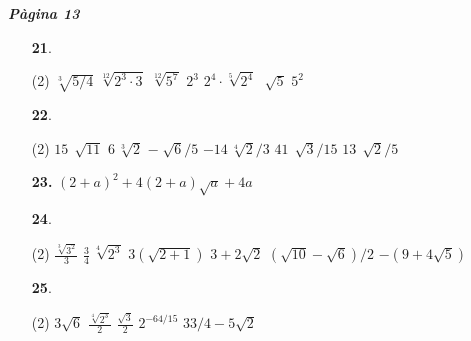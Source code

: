 \documentclass[a4paper, pdf, twoside]{book}
\begin{document}
\begin{multicols}{2}
{\textbf{\em Pàgina 13}} \hrulefill
\begin{enumerate}
\vspace{0.25cm}



 \item[\fontfamily{phv}\selectfont\color{blue}\textbf{21}. ]  \scalebox{0.6}{\simbolclau } 
 \begin{tasks}[column-sep=1em, item-indent=1.3333em](2)
	 \task $\sqrt [{3}]{5/4} $
	 \task $\sqrt [{12}]{2^{3} \cdot 3} $
	 \task $\sqrt [{12}]{5^{7} } $
	 \task $2^{3} $
	 \task $2^{4} \cdot \sqrt [{5}]{2^{4} } $
	 \task $\sqrt [{}]{5} $
	 \task $5^{2} $
\end{tasks}
 \end{enumerate}
\begin{enumerate}
\vspace{0.25cm}



 \item[\fontfamily{phv}\selectfont\color{blue}\textbf{22}. ]  \scalebox{0.6}{\simbolclau } 
 \begin{tasks}[column-sep=1em, item-indent=1.3333em](2)
	 \task  $15\,\sqrt [{}]{11} $
	 \task $6\,\sqrt [{3}]{2} $
	 \task $-\sqrt [{}]{6} /5$
	 \task $-14\,\sqrt [{4}]{2} /3$
	 \task $41\,\sqrt [{}]{3} /15$
	 \task $13\,\sqrt [{}]{2} /5$
\end{tasks}
\vspace{0.25cm}
\item[\fontfamily{phv}\selectfont\color{blue}\textbf{23. }]  \scalebox{0.6}{\simbolclau } 
$(2+a)^{2} +4(2+a)\sqrt {a} +4a$
\vspace{0.25cm}



 \item[\fontfamily{phv}\selectfont\color{blue}\textbf{24}. ]  \scalebox{0.6}{\simbolclau } 
 \begin{tasks}[column-sep=1em, item-indent=1.3333em](2)
	 \task $\frac {\sqrt [{3}]{3^{2} } }{3} $
	 \task $\frac {3}{4} \,\sqrt [{4}]{2^{3} }$
	 \task $3(\sqrt {2+1} )$
	 \task $3+2\sqrt {2} $
	 \task $(\sqrt {10} -\sqrt {6} )/2$
	 \task $-(9+4\sqrt {5} )$
\end{tasks}
\vspace{0.25cm}



 \item[\fontfamily{phv}\selectfont\color{blue}\textbf{25}. ]  \scalebox{0.6}{\simbolclau } 
 \begin{tasks}[column-sep=1em, item-indent=1.3333em](2)
	 \task $3\sqrt {6}$
	 \task* $\frac {\sqrt [{4}]{2^{3} } }{2} $
	 \task $\frac {\sqrt {3} }{2} $
	 \task $2^{-64/15} $
	 \task $33/4-5\sqrt {2} $
\end{tasks}
 \end{enumerate}
\vspace{0.3cm}


\end{multicols}
\end{document}
